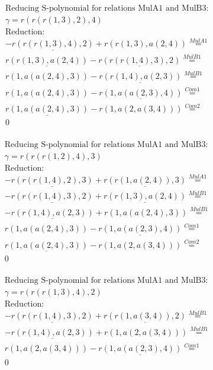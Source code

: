 \documentclass[11pt]{amsart}
\begin{document}
\begin{align*} 
& \text{Reducing S-polynomial for relations MulA1 and MulB3:} \\ 
& \gamma = r(r(r(1,3),2),4) \\ 
& \text{Reduction}: \\& - \underline{r(r(r(1,3),4),2)} + r(r(1,3),a(2,4)) \stackrel{ MulA1 }{=}  \\ 
&\underline{r(r(1,3),a(2,4))} - \underline{r(r(r(1,4),3),2)} \stackrel{ MulB1 }{=}  \\ 
&r(1,a(a(2,4),3)) - \underline{r(r(1,4),a(2,3))} \stackrel{ MulB1 }{=}  \\ 
&r(1,a(a(2,4),3)) - \underline{r(1,a(a(2,3),4))} \stackrel{ Com1 }{=}  \\ 
&\underline{r(1,a(a(2,4),3))} - r(1,a(2,a(3,4))) \stackrel{ Com2 }{=}  \\ 
&0\\ 
\end{align*} 
 
\begin{align*} 
& \text{Reducing S-polynomial for relations MulA1 and MulB3:} \\ 
& \gamma = r(r(r(1,2),4),3) \\ 
& \text{Reduction}: \\& - \underline{r(r(r(1,4),2),3)} + \underline{r(r(1,a(2,4)),3)} \stackrel{ MulA1 }{=}  \\ 
& - \underline{r(r(r(1,4),3),2)} + \underline{r(r(1,3),a(2,4))} \stackrel{ MulB1 }{=}  \\ 
& - \underline{r(r(1,4),a(2,3))} + r(1,a(a(2,4),3)) \stackrel{ MulB1 }{=}  \\ 
&r(1,a(a(2,4),3)) - \underline{r(1,a(a(2,3),4))} \stackrel{ Com1 }{=}  \\ 
&\underline{r(1,a(a(2,4),3))} - r(1,a(2,a(3,4))) \stackrel{ Com2 }{=}  \\ 
&0\\ 
\end{align*} 
 
\begin{align*} 
& \text{Reducing S-polynomial for relations MulA1 and MulB3:} \\ 
& \gamma = r(r(r(1,3),4),2) \\ 
& \text{Reduction}: \\& - \underline{r(r(r(1,4),3),2)} + \underline{r(r(1,a(3,4)),2)} \stackrel{ MulB1 }{=}  \\ 
& - \underline{r(r(1,4),a(2,3))} + r(1,a(2,a(3,4))) \stackrel{ MulB1 }{=}  \\ 
&r(1,a(2,a(3,4))) - \underline{r(1,a(a(2,3),4))} \stackrel{ Com1 }{=}  \\ 
&0\\ 
\end{align*} 
 
\end{document}
